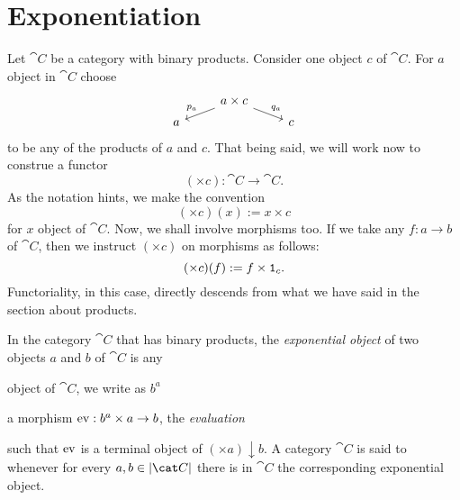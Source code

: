 
\section{Exponentiation}

Let \(\cat C\) be a category with binary products. Consider one object \(c\) of \(\cat C\). For \(a\) object in \(\cat C\) choose
\[\begin{tikzcd}[row sep=tiny]
& a \times c \ar["{p_a}", dl, swap] \ar["{q_a}", dr] & \\
a & & c
\end{tikzcd}\]
to be any of the products of \(a\) and \(c\). That being said, we will work now to construe a functor
\[(\times c) : \cat C \to \cat C .\]
As the notation hints, we make the convention
\[(\times c) (x) := x \times c\]
for \(x\) object of \(\cat C\).  Now, we shall involve morphisms too.  If we take any \(f : a \to b\) of \(\cat C\), then we instruct \((\times c)\) on morphisms as follows:
\[(\times c) (f) := f \times \mathtt 1_c .\]
 Functoriality, in this case, directly descends from what we have said in the section about products. 

\begin{definition}
In the category \(\cat C\) that has binary products, the {\em exponential object} of two objects \(a\) and \(b\) of  \(\cat C\) is any
\begin{tcbitem}
\item object of \(\cat C\), we write as \(b^a\)
\item a morphism \(\operatorname{ev} : b^a \times a \to b\), the {\em evaluation}
\end{tcbitem}
such that \(\operatorname{ev}\) is a terminal object of \((\times a) \downarrow b\). A category \(\cat C\) is said to  whenever for every \(a, b \in \obj{\cat C}\) there is in \(\cat C\) the corresponding exponential object.
\end{definition}

